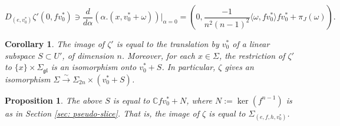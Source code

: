 \documentclass[10pt,a4paper]{amsart}
\newtheorem{corollary}{Corollary}
\newtheorem{proposition}{Proposition}
\newcommand{\CC}{\mathbb{C}}
\begin{document}
\begin{equation}\label{eq: linear constraint}
    D_{(e,v_0^*)}\zeta'(0, fv_0^*)\ni \frac{d}{d\alpha}(\alpha.(x, v_0^*+\omega))|_{\alpha=0} = (0, \frac{-1}{n^2(n-1)^2}\langle \omega, fv_0^*\rangle fv_0^* + \pi_J(\omega)).
\end{equation}

\begin{corollary}\label{cor: pointwise isomorphism}
    The image of $\zeta'$ is equal to the translation by $v_0^*$ of a linear subspace $S\subset U'$, of dimension $n$. Moreover, for each $x\in \Sigma$, the restriction of $\zeta'$ to $\{x\}\times \Sigma_\mathfrak{gl}$ is an isomorphism onto $v_0^*+S$. In particular, $\zeta$ gives an isomorphism $\Sigma\xrightarrow{\sim} \Sigma_{2n}\times (v_0^*+S)$.
\end{corollary}

\begin{proposition}
    The above $S$ is equal to $\CC fv_0^*+N$, where $N:=\ker(f^{n-1})$ is as in Section \ref{sec: pseudo-slice}. That is, the image of $\zeta$ is equal to $\Sigma_{(e, f, h, v_0^*)}$.
\end{proposition}
\end{document}

